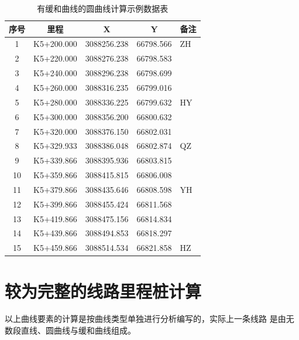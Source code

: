 \begin{table}[htbp]
\centering
\caption{有缓和曲线的圆曲线计算示例数据表}
\label{tab:HYRoute}
\begin{tabular}{ccccl}
\hline
序号 & 里程	    &        X	   &      Y	   &  备注 \\
\hline
1   & K5+200.000 & 3088256.238 & 66798.566 &  ZH  \\
2   & K5+220.000 & 3088276.238 & 66798.583 &      \\
3   & K5+240.000 & 3088296.238 & 66798.699 &      \\
4   & K5+260.000 & 3088316.235 & 66799.016 &      \\
5   & K5+280.000 & 3088336.225 & 66799.632 &  HY  \\
6   & K5+300.000 & 3088356.200 & 66800.632 &      \\
7   & K5+320.000 & 3088376.150 & 66802.031 &      \\
8   & K5+329.933 & 3088386.048 & 66802.874 &  QZ  \\
9   & K5+339.866 & 3088395.936 & 66803.815 &      \\
10  & K5+359.866 & 3088415.815 & 66806.008 &      \\
11  & K5+379.866 & 3088435.646 & 66808.598 &  YH  \\
12  & K5+399.866 & 3088455.424 & 66811.568 &      \\
13  & K5+419.866 & 3088475.156 & 66814.834 &      \\
14  & K5+439.866 & 3088494.853 & 66818.297 &      \\
15  & K5+459.866 & 3088514.534 & 66821.858 &  HZ  \\
\hline
\end{tabular}

\end{table}

\section{较为完整的线路里程桩计算}

以上曲线要素的计算是按曲线类型单独进行分析编写的，实际上一条线路
是由无数段直线、圆曲线与缓和曲线组成。


